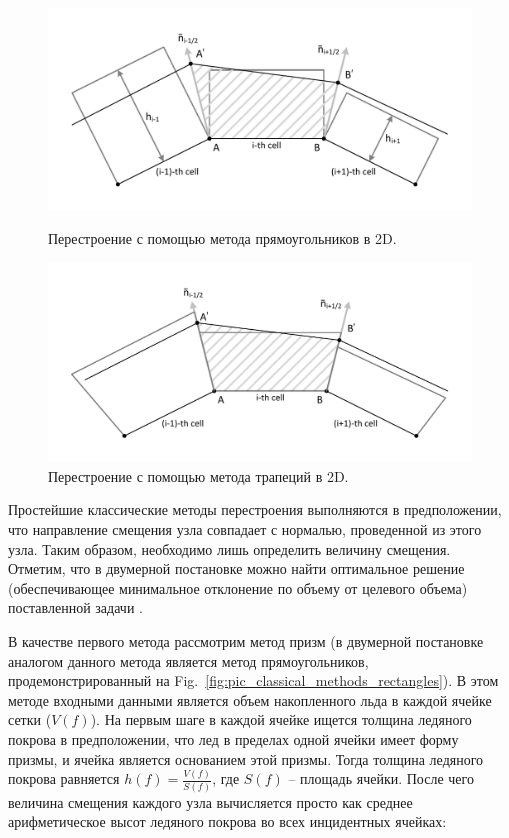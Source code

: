 \begin{figure}
  \centering
  \begin{minipage}[b]{0.49\textwidth}
    \includegraphics[width=\textwidth]{pics/pic_classical_methods_rectangles_size.pdf}
    \caption{Перестроение с помощью метода прямоугольников в 2D.}\label{fig:pic_classical_methods_rectangles}
  \end{minipage}
  \hfill
  \begin{minipage}[b]{0.49\textwidth}
    \includegraphics[width=\textwidth]{pics/pic_classical_methods_trapezoids_size.pdf}
    \caption{Перестроение с помощью метода трапеций в 2D.}\label{fig:pic_classical_methods_trapezoids}
  \end{minipage}
\end{figure}

Простейшие классические методы перестроения выполняются в предположении, что направление смещения узла совпадает с нормалью, проведенной из этого узла.
Таким образом, необходимо лишь определить величину смещения.
Отметим, что в двумерной постановке можно найти оптимальное решение (обеспечивающее минимальное отклонение по объему от целевого объема) поставленной задачи \cite{Rybakov_2D}.

В качестве первого метода рассмотрим метод призм (в двумерной постановке аналогом данного метода является метод прямоугольников, продемонстрированный на Fig.~\ref{fig:pic_classical_methods_rectangles}).
В этом методе входными данными является объем накопленного льда в каждой ячейке сетки ($V(f)$).
На первым шаге в каждой ячейке ищется толщина ледяного покрова в предположении, что лед в пределах одной ячейки имеет форму призмы, и ячейка является основанием этой призмы.
Тогда толщина ледяного покрова равняется $h(f) = \frac{V(f)}{S(f)}$, где $S(f)$ -- площадь ячейки.
После чего величина смещения каждого узла вычисляется просто как среднее арифметическое высот ледяного покрова во всех инцидентных ячейках:

